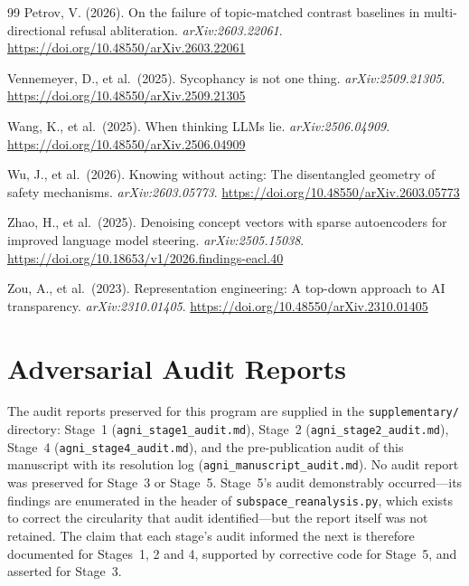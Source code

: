 \documentclass[11pt,letterpaper]{article}
\begin{document}
\begin{thebibliography}{99}
Petrov, V. (2026).
\newblock On the failure of topic-matched contrast baselines in multi-directional refusal abliteration.
\newblock \textit{arXiv:2603.22061}.
\newblock \url{https://doi.org/10.48550/arXiv.2603.22061}

Vennemeyer, D., et al.\ (2025).
\newblock Sycophancy is not one thing.
\newblock \textit{arXiv:2509.21305}.
\newblock \url{https://doi.org/10.48550/arXiv.2509.21305}

Wang, K., et al.\ (2025).
\newblock When thinking {LLMs} lie.
\newblock \textit{arXiv:2506.04909}.
\newblock \url{https://doi.org/10.48550/arXiv.2506.04909}

Wu, J., et al.\ (2026).
\newblock Knowing without acting: The disentangled geometry of safety mechanisms.
\newblock \textit{arXiv:2603.05773}.
\newblock \url{https://doi.org/10.48550/arXiv.2603.05773}

Zhao, H., et al.\ (2025).
\newblock Denoising concept vectors with sparse autoencoders for improved language model steering.
\newblock \textit{arXiv:2505.15038}.
\newblock \url{https://doi.org/10.18653/v1/2026.findings-eacl.40}

Zou, A., et al.\ (2023).
\newblock Representation engineering: A top-down approach to {AI} transparency.
\newblock \textit{arXiv:2310.01405}.
\newblock \url{https://doi.org/10.48550/arXiv.2310.01405}

\end{thebibliography}

\appendix
\section{Adversarial Audit Reports}\label{app:audits}

The audit reports preserved for this program are supplied in the \texttt{supplementary/}
directory: Stage~1 (\texttt{agni\_stage1\_audit.md}), Stage~2 (\texttt{agni\_stage2\_audit.md}),
Stage~4 (\texttt{agni\_stage4\_audit.md}), and the pre-publication audit of this manuscript with its
resolution log (\texttt{agni\_manuscript\_audit.md}). No audit report was preserved for Stage~3 or
Stage~5. Stage~5's audit demonstrably occurred---its findings are enumerated in the header of
\texttt{subspace\_reanalysis.py}, which exists to correct the circularity that audit identified---but
the report itself was not retained. The claim that each stage's audit informed the next is therefore
documented for Stages~1, 2 and 4, supported by corrective code for Stage~5, and asserted for Stage~3.
\end{document}
